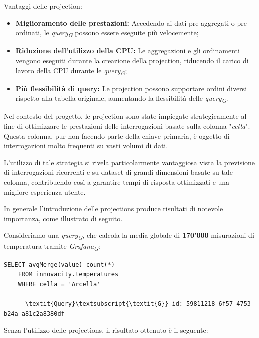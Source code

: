 Vantaggi delle projection:
\begin{itemize}
	\item \textbf{Miglioramento delle prestazioni:} Accedendo ai dati pre-aggregati o pre-ordinati, le \textit{query}\textsubscript{\textit{G}} possono essere eseguite più velocemente;
	\item \textbf{Riduzione dell'utilizzo della CPU:} Le aggregazioni e gli ordinamenti vengono eseguiti durante la creazione della projection, riducendo il carico di lavoro della CPU durante le \textit{query}\textsubscript{\textit{G}};
	\item \textbf{Più flessibilità di query:} Le projection possono supportare ordini diversi rispetto alla tabella originale, aumentando la flessibilità delle \textit{query}\textsubscript{\textit{G}}.
\end{itemize}

Nel contesto del progetto, le projection sono state impiegate strategicamente al fine di ottimizzare le prestazioni delle interrogazioni basate sulla colonna "\textit{cella}". Questa colonna, pur non facendo parte della chiave primaria, è oggetto di interrogazioni molto frequenti su vasti volumi di dati.

L'utilizzo di tale strategia si rivela particolarmente vantaggiosa vista la previsione di interrogazioni ricorrenti e su dataset di grandi dimensioni basate su tale colonna, contribuendo così a garantire tempi di risposta ottimizzati e una migliore esperienza utente.

In generale l'introduzione delle projections produce risultati di notevole importanza, come illustrato di seguito.

Consideriamo una \textit{query}\textsubscript{\textit{G}}, che calcola la media globale di \textbf{170'000} misurazioni di temperatura tramite \textit{Grafana}\textsubscript{\textit{G}}:

\begin{lstlisting}[caption={Esempio query - Grafana}, captionpos=b]
	SELECT avgMerge(value) count(*)
	FROM innovacity.temperatures
	WHERE cella = 'Arcella'

	--\textit{Query}\textsubscript{\textit{G}} id: 59811218-6f57-4753-b24a-a81c2a8380df
\end{lstlisting}

Senza l'utilizzo delle projections, il risultato ottenuto è il seguente:

